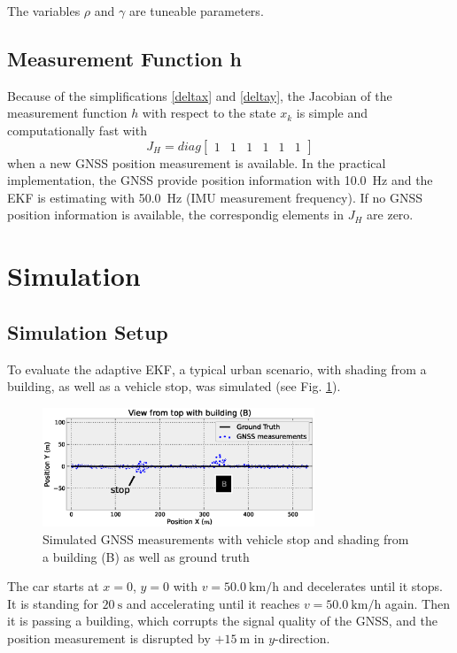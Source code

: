 \documentclass[conference]{IEEEtran}
\begin{document}
The variables $\rho$ and $\gamma$ are tuneable parameters.

\subsection{Measurement Function h}

Because of the simplifications \eqref{deltax} and \eqref{deltay}, the Jacobian of the measurement function $h$ with respect to the state $x_k$ is simple and computationally fast with 
\begin{equation}\label{hgps}J_H=diag\left[\begin{matrix}1 & 1 & 1 & 1 & 1 &1\end{matrix}\right]\end{equation}
when a new GNSS position measurement is available. In the practical implementation, the GNSS provide position information with \SI{10.0}{\hertz} and the EKF is estimating with \SI{50.0}{\hertz} (IMU measurement frequency). If no GNSS position information is available, the correspondig elements in $J_H$ are zero.

\section{Simulation}

\subsection{Simulation Setup}

To evaluate the adaptive EKF, a typical urban scenario, with shading from a building, as well as a vehicle stop, was simulated (see Fig. \ref{Testdata}).

\begin{figure}[ht]
\centering
\includegraphics[width=3.2in]{images/Testdata}
\caption{Simulated GNSS measurements with vehicle stop and shading from a building (B) as well as ground truth}
\label{Testdata}
\end{figure}

The car starts at $x=0$, $y=0$ with $v=\SI{50.0}{\kilo\metre\per\hour}$ and decelerates until it stops. It is standing for $\SI{20}{\second}$ and accelerating until it reaches $v=\SI{50.0}{\kilo\metre\per\hour}$ again. Then it is passing a building, which corrupts the signal quality of the GNSS, and the position measurement is disrupted by $+\SI{15}{\metre}$ in $y$-direction.
\end{document}
